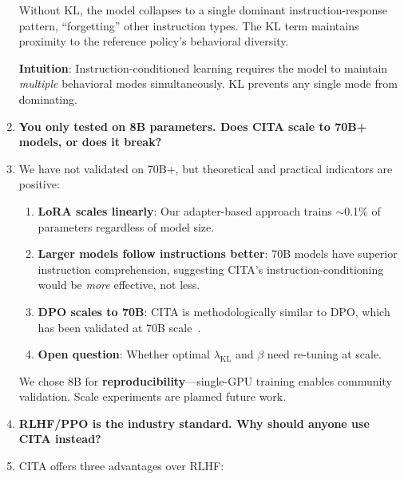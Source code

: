 \begin{enumerate}[label=\textbf{Q\arabic*.}, leftmargin=*, itemsep=8pt]
Without KL, the model collapses to a single dominant instruction-response pattern, ``forgetting'' other instruction types. The KL term maintains proximity to the reference policy's behavioral diversity.

\textbf{Intuition}: Instruction-conditioned learning requires the model to maintain \textit{multiple} behavioral modes simultaneously. KL prevents any single mode from dominating.

\vspace{4mm}

\item[\ding{93}] \textbf{You only tested on 8B parameters. Does CITA scale to 70B+ models, or does it break?}

\item[\ding{224}] We have not validated on 70B+, but theoretical and practical indicators are positive:

\begin{enumerate}[leftmargin=*,itemsep=2pt]
    \item \textbf{LoRA scales linearly}: Our adapter-based approach trains $\sim$0.1\% of parameters regardless of model size.

    \item \textbf{Larger models follow instructions better}: 70B models have superior instruction comprehension, suggesting CITA's instruction-conditioning would be \textit{more} effective, not less.

    \item \textbf{DPO scales to 70B}: CITA is methodologically similar to DPO, which has been validated at 70B scale~\cite{rafailov2023direct}.

    \item \textbf{Open question}: Whether optimal $\lambda_{\text{KL}}$ and $\beta$ need re-tuning at scale.
\end{enumerate}

We chose 8B for \textbf{reproducibility}---single-GPU training enables community validation. Scale experiments are planned future work.

\vspace{4mm}

\item[\ding{93}] \textbf{RLHF/PPO is the industry standard. Why should anyone use CITA instead?}

\item[\ding{224}] CITA offers three advantages over RLHF:


\end{enumerate}
